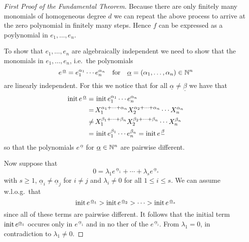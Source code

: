 \begin{proof}[First Proof of the Fundamental Theorem]
  Because there are only finitely many monomials of homogeneous degree $d$ we can repeat the above process to arrive at the zero polynomial in finitely many steps.
  Hence $f$ can be expressed as a poylynomial in $e_1, \dotsc, e_n$.
  
  To show that $e_1, \dotsc, e_n$ are algebraically independent we need to show that the monomials in $e_1, \dotsc, e_n$, i.e.\ the polynomials
  \[
      e^{\,\underline{\alpha}}
    = e_1^{\alpha_1} \dotsm e_n^{\alpha_n}
    \quad\text{for}\quad
        \underline{\alpha}
    =   (\alpha_1, \dotsc, \alpha_n)
    \in \mathbb{N}^n
  \]
  are linearly independent.
  For this we notice that for all $\underline{\alpha} \neq \underline{\beta}$ we have that
  \begin{align*}
            \operatorname{init} e^{\,\underline{\alpha}}
       =&\, \operatorname{init} e_1^{\alpha_1} \dotsm e_n^{\alpha_n}   \\
       =&\, X_1^{\alpha_1 + \dotsb + \alpha_n} X_2^{\alpha_2 + \dotsb + \alpha_n} \dotsm X_n^{\alpha_n} \\
    \neq&\, X_1^{\beta_1 + \dotsb + \beta_n}   X_2^{\beta_2  + \dotsb + \beta_n}  \dotsm X_n^{\beta_n}  \\
       =&\, \operatorname{init} e_1^{\beta_1} \dotsm e_n^{\beta_n}
       =    \operatorname{init} e^{\,\underline{\beta}}
  \end{align*}
  so that the polynomials $e^{\,\underline{\alpha}}$ for $\underline{\alpha} \in \mathbb{N}^n$ are pairwise different.
  
  Now suppose that
  \[
      0
    = \lambda_1 e^{\,\underline{\alpha}_1} + \dotsb + \lambda_s e^{\,\underline{\alpha}_s}
  \]
  with $s \geq 1$, $\underline{\alpha}_i \neq \underline{\alpha}_j$ for $i \neq j$ and $\lambda_i \neq 0$ for all $1 \leq i \leq s$.
  We can assume w.l.o.g.\ that 
  \[
      \operatorname{init} e^{\,\underline{\alpha}_1}
    > \operatorname{init} e^{\,\underline{\alpha}_2}
    > \dotsb
    > \operatorname{init} e^{\,\underline{\alpha}_s}
  \]
  since all of these terms are pairwise different.
  It follows that the initial term $\operatorname{init} e^{\underline{\alpha}_1}$ occures only in $e^{\,\underline{\alpha}_1}$ and in no ther of the $e^{\,\underline{\alpha}_i}$.
  From $\lambda_1 = 0$, in contradiction to $\lambda_1 \neq 0$.
\end{proof}


